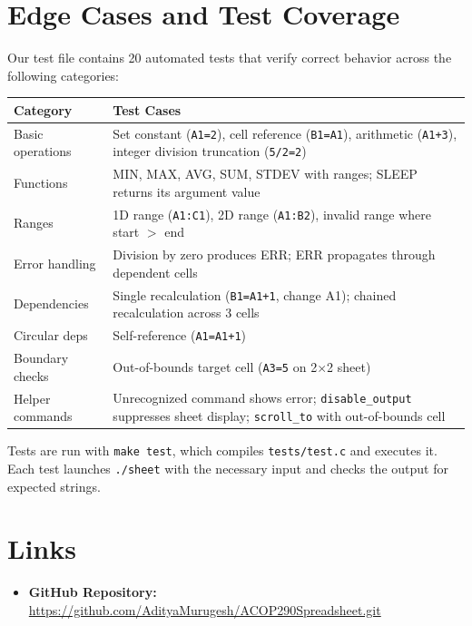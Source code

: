 \documentclass[11pt,a4paper]{article}
\begin{document}
\section{Edge Cases and Test Coverage}

Our test file contains 20 automated tests that verify correct behavior across the following categories:
\begin{table}[h]
\centering
\begin{tabular}{@{}lp{8cm}@{}}
\toprule
\textbf{Category} & \textbf{Test Cases} \\
\midrule
Basic operations & Set constant (\texttt{A1=2}), cell reference (\texttt{B1=A1}), arithmetic (\texttt{A1+3}), integer division truncation (\texttt{5/2=2}) \\
Functions & MIN, MAX, AVG, SUM, STDEV with ranges; SLEEP returns its argument value \\
Ranges & 1D range (\texttt{A1:C1}), 2D range (\texttt{A1:B2}), invalid range where start $>$ end \\
Error handling & Division by zero produces ERR; ERR propagates through dependent cells \\
Dependencies & Single recalculation (\texttt{B1=A1+1}, change A1); chained recalculation across 3 cells \\
Circular deps & Self-reference (\texttt{A1=A1+1}) \\
Boundary checks & Out-of-bounds target cell (\texttt{A3=5} on 2$\times$2 sheet) \\
Helper commands & Unrecognized command shows error; \texttt{disable\_output} suppresses sheet display; \texttt{scroll\_to} with out-of-bounds cell \\
\bottomrule
\end{tabular}
\end{table}

\noindent Tests are run with \texttt{make test}, which compiles \texttt{tests/test.c} and executes it. Each test launches \texttt{./sheet} with the necessary input and checks the output for expected strings.

\section{Links}

\begin{itemize}
    \item \textbf{GitHub Repository:} \url{https://github.com/AdityaMurugesh/ACOP290Spreadsheet.git}
\end{itemize}
\end{document}
